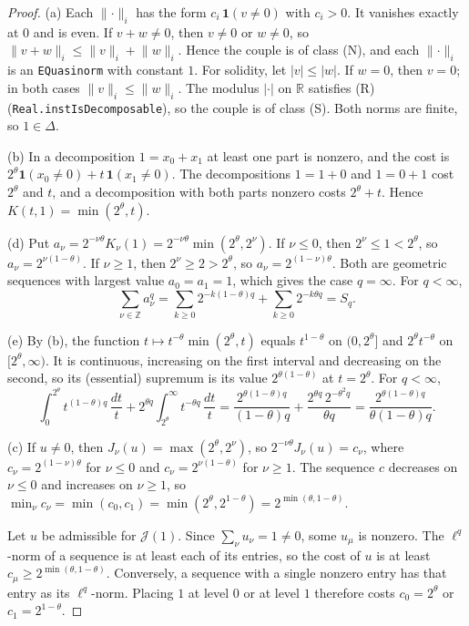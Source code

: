 \documentclass[11pt]{article}
\theoremstyle{remark}
\newcommand{\abs}[1]{\lvert #1\rvert}
\newcommand{\norm}[2]{\lVert #1\rVert_{#2}}
\newcommand{\cJ}{\mathcal J}
\newcommand{\Z}{\mathbb Z}
\newcommand{\R}{\mathbb R}
\newcommand{\one}{\mathbf 1}
\begin{document}
\begin{proof}
  (a) Each \(\norm{\cdot}{i}\) has the form \(c_i\,\one(v \ne 0)\) with \(c_i > 0\). It vanishes
  exactly at \(0\) and is even. If \(v + w \ne 0\), then \(v \ne 0\) or \(w \ne 0\), so
  \(\norm{v+w}{i} \le \norm{v}{i} + \norm{w}{i}\). Hence the couple is of class (N), and each
  \(\norm{\cdot}{i}\) is an \texttt{EQuasinorm} with constant \(1\). For solidity, let
  \(\abs{v} \le \abs{w}\). If \(w = 0\), then \(v = 0\); in both cases
  \(\norm{v}{i} \le \norm{w}{i}\). The modulus \(\abs{\cdot}\) on \(\R\) satisfies (R)
  (\texttt{Real.instIsDecomposable}), so the couple is of class (S). Both norms are finite,
  so \(1 \in \Delta\).

  (b) In a decomposition \(1 = x_0 + x_1\) at least one part is nonzero, and the cost is
  \(2^\theta\one(x_0 \ne 0) + t\,\one(x_1 \ne 0)\). The decompositions \(1 = 1 + 0\) and
  \(1 = 0 + 1\) cost \(2^\theta\) and \(t\), and a decomposition with both parts nonzero costs
  \(2^\theta + t\). Hence \(K(t,1) = \min(2^\theta, t)\).

  (d) Put \(a_\nu = 2^{-\nu\theta} K_\nu(1) = 2^{-\nu\theta}\min(2^\theta, 2^\nu)\). If
  \(\nu \le 0\), then \(2^\nu \le 1 < 2^\theta\), so \(a_\nu = 2^{\nu(1-\theta)}\). If
  \(\nu \ge 1\), then \(2^\nu \ge 2 > 2^\theta\), so \(a_\nu = 2^{(1-\nu)\theta}\). Both are
  geometric sequences with largest value \(a_0 = a_1 = 1\), which gives the case
  \(q = \infty\). For \(q < \infty\),
  \[
    \sum_{\nu\in\Z} a_\nu^q = \sum_{k\ge0} 2^{-k(1-\theta)q} + \sum_{k\ge0} 2^{-k\theta q} = S_q .
  \]

  (e) By (b), the function \(t \mapsto t^{-\theta}\min(2^\theta, t)\) equals
  \(t^{1-\theta}\) on \((0, 2^\theta]\) and \(2^\theta t^{-\theta}\) on \([2^\theta, \infty)\).
  It is continuous, increasing on the first interval and decreasing on the second, so its
  (essential) supremum is its value \(2^{\theta(1-\theta)}\) at \(t = 2^\theta\). For
  \(q < \infty\),
  \[
    \int_0^{2^\theta} t^{(1-\theta)q}\,\frac{dt}{t} + 2^{\theta q}\int_{2^\theta}^\infty
    t^{-\theta q}\,\frac{dt}{t}
    = \frac{2^{\theta(1-\theta)q}}{(1-\theta)q} + \frac{2^{\theta q}\,2^{-\theta^2 q}}{\theta q}
    = \frac{2^{\theta(1-\theta)q}}{\theta(1-\theta)q}.
  \]

  (c) If \(u \ne 0\), then \(J_\nu(u) = \max(2^\theta, 2^\nu)\), so
  \(2^{-\nu\theta}J_\nu(u) = c_\nu\), where \(c_\nu = 2^{(1-\nu)\theta}\) for \(\nu \le 0\)
  and \(c_\nu = 2^{\nu(1-\theta)}\) for \(\nu \ge 1\). The sequence \(c\) decreases on
  \(\nu \le 0\) and increases on \(\nu \ge 1\), so
  \(\min_\nu c_\nu = \min(c_0, c_1) = \min(2^\theta, 2^{1-\theta}) = 2^{\min(\theta,1-\theta)}\).

  Let \(u\) be admissible for \(\cJ(1)\). Since \(\sum_\nu u_\nu = 1 \ne 0\), some
  \(u_\mu\) is nonzero. The \(\ell^q\)-norm of a sequence is at least each of its entries, so the
  cost of \(u\) is at least \(c_\mu \ge 2^{\min(\theta,1-\theta)}\). Conversely, a sequence
  with a single nonzero entry has that entry as its \(\ell^q\)-norm. Placing \(1\) at level
  \(0\) or at level \(1\) therefore costs \(c_0 = 2^\theta\) or \(c_1 = 2^{1-\theta}\).
\end{proof}
\end{document}
